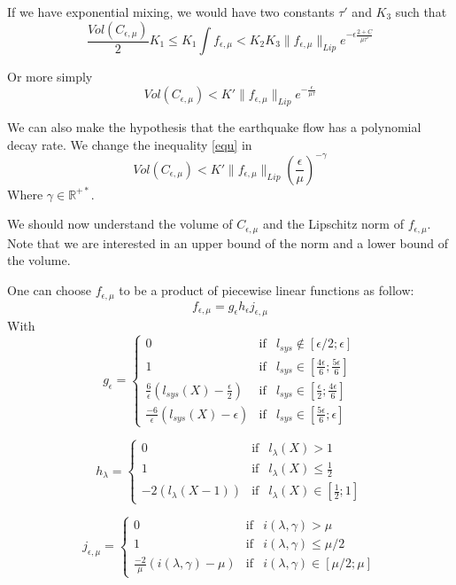 If we have exponential mixing, we would have two constants $\tau'$ and $K_3$ such that \[
\frac{Vol(C_{\epsilon,\mu})}{2}K_1 \leq K_1 \int f_{\epsilon,\mu}
< K_2 K_3 \| f_{\epsilon,\mu} \|_{Lip} e^{-\epsilon \frac{2+C}{\mu \tau'}}
\]

Or more simply \begin{equation}
Vol(C_{\epsilon,\mu}) < K' \| f_{\epsilon,\mu} \|_{Lip} e^{-\frac{\epsilon}{\mu \tau}}
\label{equ}
\end{equation}


We can also make the hypothesis that the earthquake flow has a polynomial decay rate. We change the inequality \ref{equ} in
\begin{equation}
Vol(C_{\epsilon,\mu}) < K' \| f_{\epsilon,\mu} \|_{Lip} \left(\frac{\epsilon}{\mu}\right)^{-\gamma}
\label{poly}
\end{equation}
Where $\gamma \in \mathbb{R^{+*}}$.

We should now understand the volume of $C_{\epsilon,\mu}$ and the Lipschitz norm of $f_{\epsilon,\mu}$. Note that we are interested in an upper bound of the norm and a lower bound of the volume.


One can choose $f_{\epsilon,\mu}$ to be a product of piecewise linear functions as follow:\[
f_{\epsilon,\mu}=g_{\epsilon}h_{\epsilon}j_{\epsilon,\mu}
\]
With
$$
g_{\epsilon} = \left \{
\begin{array}{lll}
0 & \text{if} & l_{sys} \notin [\epsilon/2;\epsilon]\\
1 & \text{if} & l_{sys} \in [\frac{4 \epsilon}{6};\frac{5 \epsilon}{6}]\\
\frac{6}{\epsilon}(l_{sys}(X)-\frac{\epsilon}{2}) & \text{if} & l_{sys} \in [\frac{\epsilon}{2};\frac{4 \epsilon}{6}]\\
\frac{-6}{\epsilon}(l_{sys}(X)-\epsilon) & \text{if} & l_{sys} \in [\frac{5 \epsilon}{6};\epsilon]
\end{array}
\right .
$$

$$
h_{\lambda} = \left \{
\begin{array}{lll}
0 & \text{if} & l_{\lambda}(X) > 1\\
1 & \text{if} & l_{\lambda}(X) \leq \frac{1}{2}\\
-2(l_\lambda(X -1)) & \text{if} & l_{\lambda}(X) \in [\frac{1}{2};1]
\end{array}
\right .
$$

$$
j_{\epsilon,\mu} = \left \{
\begin{array}{lll}
0 & \text{if} & i(\lambda,\gamma) > \mu\\
1 & \text{if} & i(\lambda,\gamma) \leq \mu/2\\
\frac{-2 }{\mu}(i(\lambda,\gamma)-\mu) & \text{if} & i(\lambda,\gamma) \in [\mu/2; \mu]
\end{array}
\right .
$$

